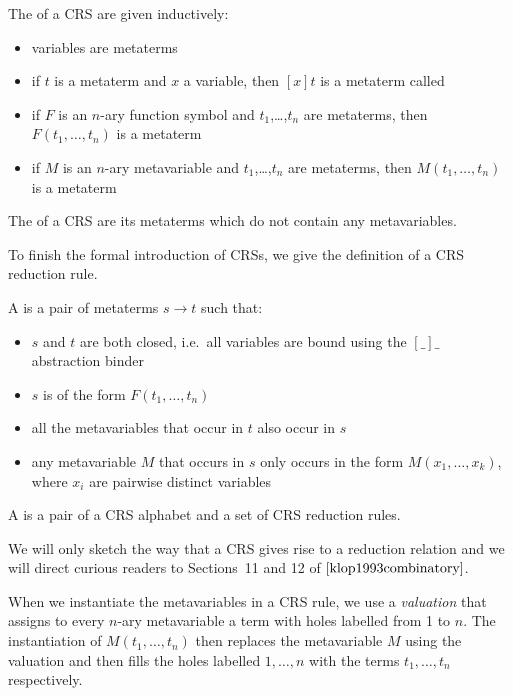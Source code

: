 \begin{definition}
  The  of a CRS are given inductively:
  \begin{itemize}
  \item variables are metaterms
  \item if $t$ is a metaterm and $x$ a variable, then $[x]t$ is a metaterm
    called 
  \item if $F$ is an $n$-ary function symbol and $t_1$,\ldots,$t_n$ are
    metaterms, then $F(t_1,\ldots,t_n)$ is a metaterm
  \item if $M$ is an $n$-ary metavariable and $t_1$,\ldots,$t_n$ are
    metaterms, then $M(t_1,\ldots,t_n)$ is a metaterm
  \end{itemize}
\end{definition}

\begin{definition}
  The  of a CRS are its metaterms which do not contain any
  metavariables.
\end{definition}

To finish the formal introduction of CRSs, we give the definition of a CRS
reduction rule.

\begin{definition}
  A  is a pair of metaterms $s \to t$ such that:
  \begin{itemize}
  \item $s$ and $t$ are both closed, i.e.\ all variables are bound using
    the $[\_]\_$ abstraction binder
  \item $s$ is of the form $F(t_1,\ldots,t_n)$
  \item all the metavariables that occur in $t$ also occur in $s$
  \item any metavariable $M$ that occurs in $s$ only occurs in the form
    $M(x_1,\ldots,x_k)$, where $x_i$ are pairwise distinct variables
  \end{itemize}
\end{definition}

\begin{definition}
  A  is a pair of a CRS alphabet
  and a set of CRS reduction rules.
\end{definition}

We will only sketch the way that a CRS gives rise to a reduction relation
and we will direct curious readers to Sections~11 and 12 of
$\cite{klop1993combinatory}$.

When we instantiate the metavariables in a CRS rule, we use a
\emph{valuation} that assigns to every $n$-ary metavariable a term with
holes labelled from 1 to $n$. The instantiation of $M(t_1,\ldots,t_n)$ then
replaces the metavariable $M$ using the valuation and then fills the holes
labelled $1,\ldots,n$ with the terms $t_1,\ldots,t_n$ respectively.

